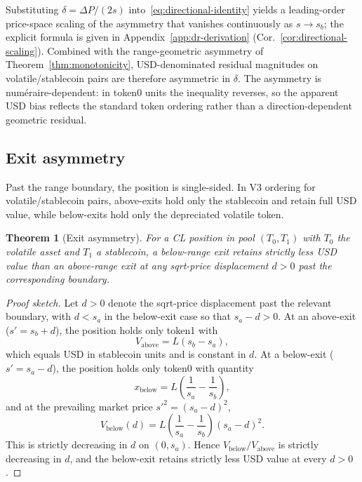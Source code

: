 \documentclass[11pt,a4paper]{article}
\theoremstyle{plain}
\newtheorem{theorem}{Theorem}
\begin{document}
Substituting $\delta = \Delta P/(2s)$ into~\eqref{eq:directional-identity} yields a leading-order price-space scaling of the asymmetry that vanishes continuously as $s \to s_b$; the explicit formula is given in Appendix~\ref{app:dr-derivation} (Cor.~\ref{cor:directional-scaling}). Combined with the range-geometric asymmetry of Theorem~\ref{thm:monotonicity}, USD-denominated residual magnitudes on volatile/stablecoin pairs are therefore asymmetric in $\delta$. The asymmetry is num\'eraire-dependent: in token0 units the inequality reverses, so the apparent USD bias reflects the standard token ordering rather than a direction-dependent geometric residual.

\subsection{Exit asymmetry}\label{sec:exit}

Past the range boundary, the position is single-sided. In V3 ordering for volatile/stablecoin pairs, above-exits hold only the stablecoin and retain full USD value, while below-exits hold only the depreciated volatile token.

\begin{theorem}[Exit asymmetry]\label{thm:exit}
For a CL position in pool $(T_0, T_1)$ with $T_0$ the volatile asset and $T_1$ a stablecoin, a below-range exit retains strictly less USD value than an above-range exit at any sqrt-price displacement $d > 0$ past the corresponding boundary.
\end{theorem}

\begin{proof}[Proof sketch]
Let $d > 0$ denote the sqrt-price displacement past the relevant boundary, with $d < s_a$ in the below-exit case so that $s_a - d > 0$. At an above-exit ($s' = s_b + d$), the position holds only token1 with
\[
V_{\text{above}} = L(s_b - s_a),
\]
which equals USD in stablecoin units and is constant in $d$. At a below-exit ($s' = s_a - d$), the position holds only token0 with quantity
\[
x_{\text{below}} = L\left(\frac{1}{s_a} - \frac{1}{s_b}\right),
\]
and at the prevailing market price $s'^2 = (s_a - d)^2$,
\begin{equation}\label{eq:vbelow}
V_{\text{below}}(d) = L\left(\frac{1}{s_a} - \frac{1}{s_b}\right)(s_a - d)^2.
\end{equation}
This is strictly decreasing in $d$ on $(0, s_a)$. Hence $V_{\text{below}}/V_{\text{above}}$ is strictly decreasing in $d$, and the below-exit retains strictly less USD value at every $d > 0$.
\end{proof}
\end{document}
